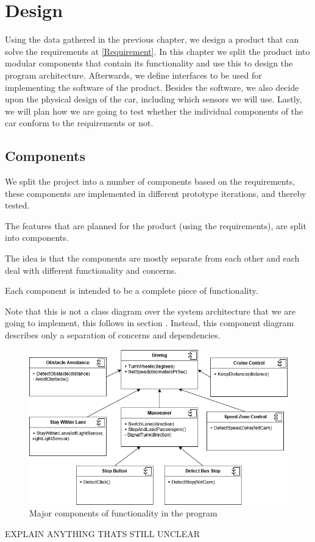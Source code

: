 \chapter{Design}
Using the data gathered in the previous chapter, we design a product that can solve the requirements at \ref{Requirement}. In this chapter we split the product into modular components that contain its functionality and use this to design the program architecture. Afterwards, we define interfaces to be used for implementing the software of the product. Besides the software, we also decide upon the physical design of the car, including which sensors we will use. Lastly, we will plan how we are going to test whether the individual components of the car conform to the requirements or not.

\section{Components}

We split the project into a number of components based on the requirements,  these components are implemented in different prototype iterations, and thereby tested. 



The features that are planned for the product (using the requirements), are split into components. 

The idea is that the components are mostly separate from each other and each deal with different functionality and concerns. 

Each component is intended to be a complete piece of functionality.

Note that this is not a class diagram over the system architecture that we are going to implement, this follows in section . Instead, this component diagram describes only a separation of concerns and dependencies.





\begin{figure}[h]
    \includegraphics[width=\textwidth]{Images/Design/componentDiagram.png}
    \caption{Major components of functionality in the program}
\end{figure}
EXPLAIN ANYTHING THATS STILL UNCLEAR

